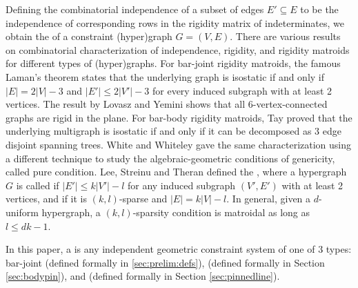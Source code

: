 Defining the combinatorial independence of a subset of edges $E'\subseteq E$ to be the independence of corresponding rows in the rigidity matrix of indeterminates, we obtain the  of a constraint (hyper)graph $G = (V,E)$.
There are various results on combinatorial characterization of independence, rigidity, and rigidity matroids for different types of (hyper)graphs. For bar-joint rigidity matroids, the famous Laman's theorem \cite{laman1970graphs} states that the underlying graph is isostatic if and only if $|E| = 2|V|-3$ and $|E'| \le 2|V'|-3$ for every induced subgraph with at least 2 vertices. The result by Lovasz and Yemini \cite{lovasz1982generic} shows that all 6-vertex-connected graphs are rigid in the plane. For bar-body rigidity matroids, Tay \cite{tay1976rigidity} proved that the underlying multigraph is isostatic if and only if it can be decomposed as $3$ edge disjoint spanning trees. White and Whiteley \cite{white1987algebraic} gave the same characterization using a different technique to study the algebraic-geometric conditions of genericity, called pure condition. Lee, Streinu and Theran \cite{lee2007graded} defined the , where a hypergraph $G$ is called  if $|E'| \le k|V'| - l$ for any induced subgraph $(V',E')$ with at least 2 vertices, and  if it is $(k,l)$-sparse and $|E| = k|V| - l$. In general, given a $d$-uniform hypergraph, a $(k,l)$-sparsity condition is matroidal as long as $l \le dk-1$.

In this paper, a  is any independent geometric constraint system of one of 3 types: bar-joint (defined formally in \ref{sec:prelim:defs}),  (defined formally in Section \ref{sec:bodypin}), and  (defined formally in Section \ref{sec:pinnedline}).





